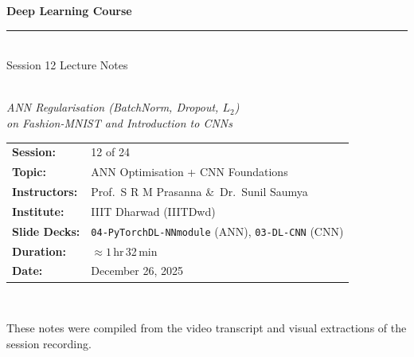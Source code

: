 \documentclass[12pt,a4paper]{article}
\newcommand{\Ltwo}{L_2}
\begin{document}

\begin{titlepage}
  \centering
  \vspace*{2cm}
  {\LARGE\bfseries Deep Learning Course\\[0.4em]
   \rule{\linewidth}{0.5pt}\\[0.6em]
   Session 12 Lecture Notes}\\[1.2em]
  {\large\itshape ANN Regularisation (BatchNorm, Dropout, $\Ltwo$)\\
   on Fashion-MNIST and Introduction to CNNs}\\[2em]
  \begin{tabular}{ll}
    \textbf{Session:}     & 12 of 24 \\[0.3em]
    \textbf{Topic:}       & ANN Optimisation + CNN Foundations \\[0.3em]
    \textbf{Instructors:} & Prof.\ S R M Prasanna \&\ Dr.\ Sunil Saumya \\[0.3em]
    \textbf{Institute:}   & IIIT Dharwad (IIITDwd) \\[0.3em]
    \textbf{Slide Decks:} & \texttt{04-PyTorchDL-NNmodule} (ANN),
                            \texttt{03-DL-CNN} (CNN) \\[0.3em]
    \textbf{Duration:}    & $\approx 1$\,hr\,32\,min \\[0.3em]
    \textbf{Date:}        & December 26, 2025 \\
  \end{tabular}\\[3em]
  \begin{abstract}
    \noindent
    Session 12 bridges the hands-on ANN experiments from Session 11 with the
    theoretical and practical foundations of Convolutional Neural Networks
    (CNNs).  The first hour is devoted to reviewing the three versions of the
    Fashion-MNIST ANN built in the previous session, identifying the
    overfitting gap (training accuracy 98\,\% vs.\ test accuracy 88\,\%),
    and introducing three complementary regularisation strategies:
    $\Ltwo$~weight-decay, Batch Normalisation, and Dropout.  An optimised
    fourth version combines all three remedies and achieves a tighter
    train/test gap ($93\,\% / 88\,\%$).  The second half of the session is
    presented by Prof.\ Prasanna, who motivates CNNs from first principles
    --- the spatial structure of image data, the history of the ImageNet
    challenge, and the fundamental distinction between matrix multiplication
    (used in ANNs) and the convolution operation (used in CNNs).
  \end{abstract}
  \vfill
  {\small These notes were compiled from the video transcript and visual
   extractions of the session recording.}
\end{titlepage}
\end{document}

